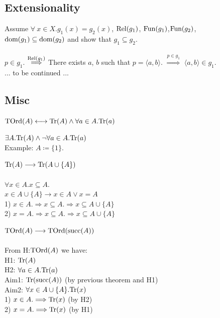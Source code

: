 \documentclass[10pt,a4paper]{article}
\begin{document}
\subsection{Extensionality}
\begin{theorem}
Assume $\forall~x\in X. g_1(x)=g_2(x)$, ${\textrm{Rel}}(g_1)$, ${\textrm{Fun}}(g_1)$,${\textrm{Fun}}(g_2)$,\\ ${\textrm{dom}}(g_1)\subseteq{\textrm{dom}}(g_2)$ and show that $g_1\subseteq g_2$.\\
\myprf\\
$p\in g_1$.
$\stackrel{{\textrm{Rel}}(g_1)}{\Longrightarrow}$
There exists $a$, $b$ such that $p=\langle a, b\rangle$.
$\stackrel{p\in g_1}{\Longrightarrow}$ $\langle a, b\rangle\in g_1$.
\\
... to be continued ...
\\\myqed 
\end{theorem}
\subsection{Misc}
\begin{definition}
${\textrm{TOrd}}(A) \longleftrightarrow {\textrm{Tr}}(A)\land \forall a\in A. {\textrm{Tr}}(a)$
\end{definition}
\begin{theorem}
$\exists A. {\textrm{Tr}}(A) \land \neg \forall a\in A. {\textrm{Tr}}(a)$
\\Example: $A\coloneqq \{1\}$.
\end{theorem}
\begin{theorem}
${\textrm{Tr}}(A) \longrightarrow {\textrm{Tr}}(A\cup\{A\})$
\\\myprf
\\$\forall x\in A.x\subseteq A.$
\\$x\in A\cup\{A\} \longrightarrow x\in A \lor x=A$
\\1) $x\in A. \Longrightarrow x\subseteq A. \Longrightarrow x\subseteq A\cup\{A\}$
\\2) $x = A. \Longrightarrow x\subseteq A. \Longrightarrow x\subseteq A\cup\{A\}$
\\\myqed
\end{theorem}
\begin{theorem}
  $ {\textrm{TOrd}}(A) \longrightarrow {\textrm{TOrd}}({\textrm{succ}}(A))$
\\\myprf
\\From H:${\textrm{TOrd}}(A)$ we have:
\\H1: ${\textrm{Tr}}(A)$
\\H2: $\forall a\in A. {\textrm{Tr}}(a)$
\\Aim1: ${\textrm{Tr}}({\textrm{succ}}(A))$ (by previous theorem and H1)
\\Aim2: $\forall x\in A\cup\{A\}. {\textrm{Tr}}(x)$
\\1) $x\in A. \Longrightarrow {\textrm{Tr}}(x)$ (by H2)
\\2) $x = A. \Longrightarrow {\textrm{Tr}}(x)$ (by H1) %
\\\myqed
\end{theorem}
\end{document}

